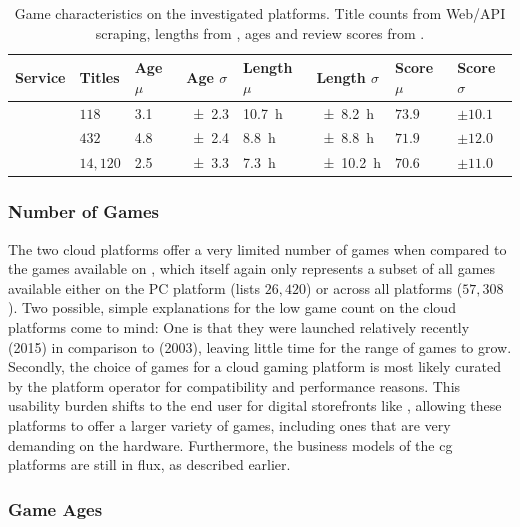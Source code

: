 % 
% 


\begin{table}
\centering
\caption{Game characteristics on the investigated platforms. Title counts from Web/API scraping, lengths from \hltb, ages and review scores from \metacritic.}
\label{tab:game-stats}
	\begin{tabu}{X[2]|X[r]X[r]X[r]X[r]X[r]X[r]X[r]}
	\toprule
	Service & Titles & Age $\mu$ & Age $\sigma$ & Length $\mu$ & Length $\sigma$ & Score $\mu$ & Score $\sigma$ \\
	\midrule
	\gfnow & $118$ & \SI{3.1}{\year} & \SI{\pm2.3}{\year} & \SI{10.7}{\hour} & \SI{\pm8.2}{\hour} & $73.9$ & $\pm10.1$ \\
	\psnow & $432$ & \SI{4.8}{\year} & \SI{\pm2.4}{\year} & \SI{8.8}{\hour} & \SI{\pm8.8}{\hour} & $71.9$ & $\pm12.0$ \\
	\steam & $14,120$ & \SI{2.5}{\year} & \SI{\pm3.3}{\year} & \SI{7.3}{\hour} & \SI{\pm10.2}{\hour} & $70.6$ & $\pm11.0$ \\
	\bottomrule
	\end{tabu}
\end{table}


\subsubsection{Number of Games}

The two cloud
platforms offer a very limited number of games when compared to the
games available on \steam, which itself again only represents a subset
of all games available either on the PC platform (\metacritic lists
$26,420$) or across all platforms ($57,308$). Two
possible, simple explanations for the low game count on the cloud
platforms come to mind: One is that they were launched relatively
recently (2015) in comparison to \steam (2003), leaving little time for
the range of games to grow. Secondly, the choice of games for a cloud
gaming platform is most likely curated by the platform operator for
compatibility and performance reasons. This usability burden shifts to
the end user for digital storefronts like \steam, allowing these
platforms to offer a larger variety of games, including ones that are
very demanding on the hardware. Furthermore, the business models
of the \gls{cg} platforms are still in flux, as described earlier.


\subsubsection{Game Ages}

